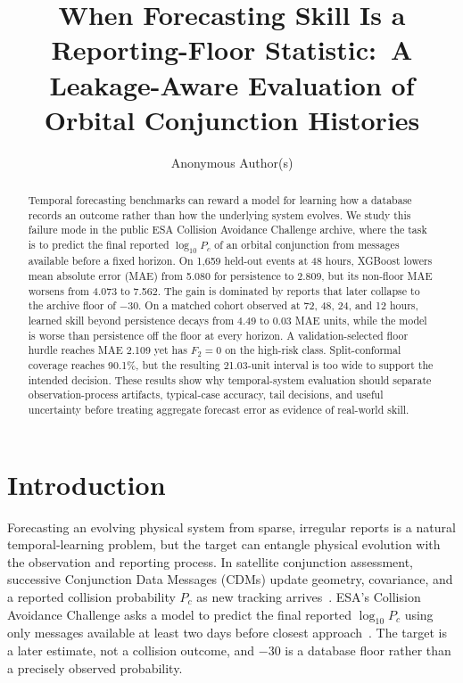 \documentclass{article}
\title{When Forecasting Skill Is a Reporting-Floor Statistic:\
A Leakage-Aware Evaluation of Orbital Conjunction Histories}
\author{Anonymous Author(s)}
\begin{document}
\maketitle

\begin{abstract}
Temporal forecasting benchmarks can reward a model for learning how a database records an outcome rather than how the underlying system evolves. We study this failure mode in the public ESA Collision Avoidance Challenge archive, where the task is to predict the final reported $\log_{10} P_c$ of an orbital conjunction from messages available before a fixed horizon. On 1,659 held-out events at 48 hours, XGBoost lowers mean absolute error (MAE) from 5.080 for persistence to 2.809, but its non-floor MAE worsens from 4.073 to 7.562. The gain is dominated by reports that later collapse to the archive floor of $-30$. On a matched cohort observed at 72, 48, 24, and 12 hours, learned skill beyond persistence decays from 4.49 to 0.03 MAE units, while the model is worse than persistence off the floor at every horizon. A validation-selected floor hurdle reaches MAE 2.109 yet has $F_2=0$ on the high-risk class. Split-conformal coverage reaches 90.1\%, but the resulting 21.03-unit interval is too wide to support the intended decision. These results show why temporal-system evaluation should separate observation-process artifacts, typical-case accuracy, tail decisions, and useful uncertainty before treating aggregate forecast error as evidence of real-world skill.
\end{abstract}

\section{Introduction}

Forecasting an evolving physical system from sparse, irregular reports is a natural temporal-learning problem, but the target can entangle physical evolution with the observation and reporting process. In satellite conjunction assessment, successive Conjunction Data Messages (CDMs) update geometry, covariance, and a reported collision probability $P_c$ as new tracking arrives~\citep{ccsdsCdm}. ESA's Collision Avoidance Challenge asks a model to predict the final reported $\log_{10} P_c$ using only messages available at least two days before closest approach~\citep{uriot2021,esaKelvins}. The target is a later estimate, not a collision outcome, and $-30$ is a database floor rather than a precisely observed probability.
\end{document}
